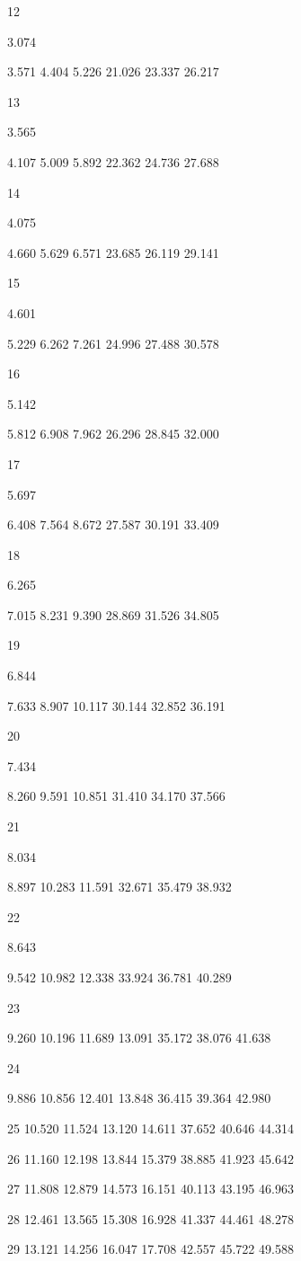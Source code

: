 \documentclass[a4paper,portrait,12pt]{article}
\begin{document}
12


3.074


3.571 4.404 5.226 21.026 23.337 26.217


13


3.565


4.107 5.009 5.892 22.362 24.736 27.688


14


4.075


4.660 5.629 6.571 23.685 26.119 29.141


15


4.601


5.229 6.262 7.261 24.996 27.488 30.578


16


5.142


5.812 6.908 7.962 26.296 28.845 32.000


17


5.697


6.408 7.564 8.672 27.587 30.191 33.409


18


6.265


7.015 8.231 9.390 28.869 31.526 34.805


19


6.844


7.633 8.907 10.117 30.144 32.852 36.191


20


7.434


8.260 9.591 10.851 31.410 34.170 37.566


21


8.034


8.897 10.283 11.591 32.671 35.479 38.932


22


8.643


9.542 10.982 12.338 33.924 36.781 40.289


23


9.260 10.196 11.689 13.091 35.172 38.076 41.638


24


9.886 10.856 12.401 13.848 36.415 39.364 42.980


25 10.520 11.524 13.120 14.611 37.652 40.646 44.314


26 11.160 12.198 13.844 15.379 38.885 41.923 45.642


27 11.808 12.879 14.573 16.151 40.113 43.195 46.963


28 12.461 13.565 15.308 16.928 41.337 44.461 48.278


29 13.121 14.256 16.047 17.708 42.557 45.722 49.588
\end{document}
